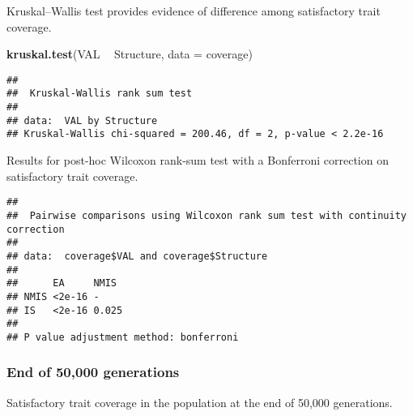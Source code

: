 \documentclass[]{book}
\newenvironment{Shaded}{\begin{snugshade}}{\end{snugshade}}
\newcommand{\DataTypeTok}[1]{\textcolor[rgb]{0.13,0.29,0.53}{#1}}
\newcommand{\KeywordTok}[1]{\textcolor[rgb]{0.13,0.29,0.53}{\textbf{#1}}}
\newcommand{\NormalTok}[1]{#1}
\newcommand{\OperatorTok}[1]{\textcolor[rgb]{0.81,0.36,0.00}{\textbf{#1}}}
\newcommand{\OtherTok}[1]{\textcolor[rgb]{0.56,0.35,0.01}{#1}}
\newcommand{\StringTok}[1]{\textcolor[rgb]{0.31,0.60,0.02}{#1}}
\begin{document}
Kruskal--Wallis test provides evidence of difference among satisfactory trait coverage.

\begin{Shaded}
\begin{Highlighting}[]
\KeywordTok{kruskal.test}\NormalTok{(VAL }\OperatorTok{~}\StringTok{ }\NormalTok{Structure, }\DataTypeTok{data =}\NormalTok{ coverage)}
\end{Highlighting}
\end{Shaded}

\begin{verbatim}
## 
##  Kruskal-Wallis rank sum test
## 
## data:  VAL by Structure
## Kruskal-Wallis chi-squared = 200.46, df = 2, p-value < 2.2e-16
\end{verbatim}

Results for post-hoc Wilcoxon rank-sum test with a Bonferroni correction on satisfactory trait coverage.

\begin{Shaded}
\end{Shaded}

\begin{verbatim}
## 
##  Pairwise comparisons using Wilcoxon rank sum test with continuity correction 
## 
## data:  coverage$VAL and coverage$Structure 
## 
##      EA     NMIS 
## NMIS <2e-16 -    
## IS   <2e-16 0.025
## 
## P value adjustment method: bonferroni
\end{verbatim}

\hypertarget{end-of-50000-generations-22}{%
\subsubsection{End of 50,000 generations}\label{end-of-50000-generations-22}}

Satisfactory trait coverage in the population at the end of 50,000 generations.
\end{document}

